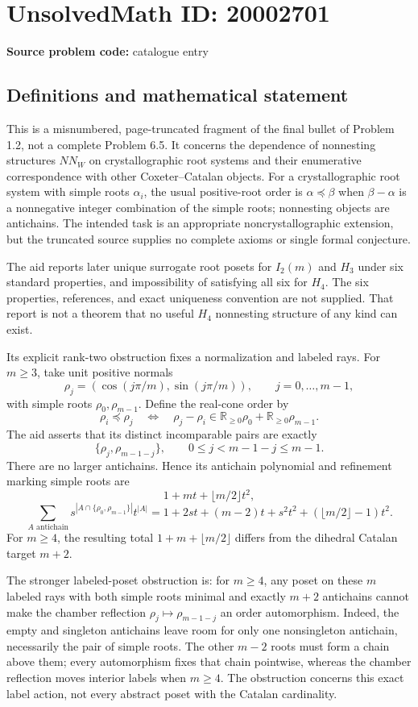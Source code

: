 \documentclass[11pt]{article}
\newcommand{\R}{\mathbb{R}}
\begin{document}
\section*{UnsolvedMath ID: 20002701}
\textbf{Source problem code:} catalogue entry
\subsection{Definitions and mathematical statement}
This is a misnumbered, page-truncated fragment of the final bullet of Problem 1.2, not a complete Problem 6.5. It concerns the dependence of nonnesting structures \(NN_W\) on crystallographic root systems and their enumerative correspondence with other Coxeter--Catalan objects. For a crystallographic root system with simple roots \(\alpha_i\), the usual positive-root order is \(\alpha\preceq\beta\) when \(\beta-\alpha\) is a nonnegative integer combination of the simple roots; nonnesting objects are antichains. The intended task is an appropriate noncrystallographic extension, but the truncated source supplies no complete axioms or single formal conjecture.

The aid reports later unique surrogate root posets for \(I_2(m)\) and \(H_3\) under six standard properties, and impossibility of satisfying all six for \(H_4\). The six properties, references, and exact uniqueness convention are not supplied. That report is not a theorem that no useful \(H_4\) nonnesting structure of any kind can exist.

Its explicit rank-two obstruction fixes a normalization and labeled rays. For \(m\ge3\), take unit positive normals
\[
 \rho_j=(\cos(j\pi/m),\sin(j\pi/m)),\qquad j=0,\ldots,m-1,
\]
with simple roots \(\rho_0,\rho_{m-1}\). Define the real-cone order by
\[
 \rho_i\preceq\rho_j\quad\Longleftrightarrow\quad
 \rho_j-\rho_i\in\R_{\ge0}\rho_0+\R_{\ge0}\rho_{m-1}.
\]
The aid asserts that its distinct incomparable pairs are exactly
\[
 \{\rho_j,\rho_{m-1-j}\},\qquad0\le j<m-1-j\le m-1.
\]
There are no larger antichains. Hence its antichain polynomial and refinement marking simple roots are
\[
 1+mt+\lfloor m/2\rfloor t^2,
\]
\[
 \sum_{A\text{ antichain}}s^{|A\cap\{\rho_0,\rho_{m-1}\}|}t^{|A|}
 =1+2st+(m-2)t+s^2t^2+(\lfloor m/2\rfloor-1)t^2.
\]
For \(m\ge4\), the resulting total \(1+m+\lfloor m/2\rfloor\) differs from the dihedral Catalan target \(m+2\).

The stronger labeled-poset obstruction is: for \(m\ge4\), any poset on these \(m\) labeled rays with both simple roots minimal and exactly \(m+2\) antichains cannot make the chamber reflection \(\rho_j\mapsto\rho_{m-1-j}\) an order automorphism. Indeed, the empty and singleton antichains leave room for only one nonsingleton antichain, necessarily the pair of simple roots. The other \(m-2\) roots must form a chain above them; every automorphism fixes that chain pointwise, whereas the chamber reflection moves interior labels when \(m\ge4\). The obstruction concerns this exact label action, not every abstract poset with the Catalan cardinality.
\end{document}
